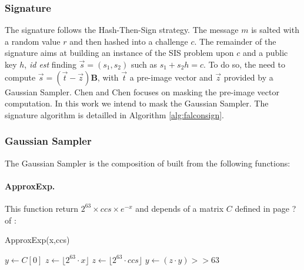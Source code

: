\documentclass[runningheads]{llncs}
\begin{document}
\subsubsection{Signature} The signature follows the Hash-Then-Sign strategy. The message $m$ is salted with a random value $r$ and then hashed into a challenge $c$. The remainder of the signature aims at building an instance of the SIS problem upon $c$ and a public key $h$, \emph{id est} finding $\vec{s} =(s_1,s_2)$ such as $s_1 + s_2 h = c$. To do so, the need to compute $\vec{s} = (\vec{t}-\vec{z})\mathbf{B}$, with $\vec{t}$ a pre-image vector and $\vec{z}$ provided by a Gaussian Sampler. Chen and Chen \cite{Chen_Chen_2024} focuses on masking the pre-image vector computation. In this work we intend to mask the Gaussian Sampler. The signature algorithm is detailled in Algorithm \ref{alg:falconsign}.
%
%
\subsubsection{Gaussian Sampler}

The Gaussian Sampler is the composition of built from the following functions:

\paragraph{ApproxExp.} This function return $2^{63}\times ccs \times e^{-x}$ and depends of a matrix $C$ defined in page ? of \cite{prest2020falcon}:
%


\begin{algorithm}[H]
  \caption{ApproxExp(x,ccs) \cite{prest2020falcon}}
  \small
$y \leftarrow C[0]$ 
  $z \leftarrow \lfloor 2^{63}\cdot x\rfloor$\;
$z \leftarrow \lfloor 2^{63}\cdot ccs\rfloor$\;
$y\leftarrow (z\cdot y)>>63$\;
\;
\end{algorithm}
\end{document}
